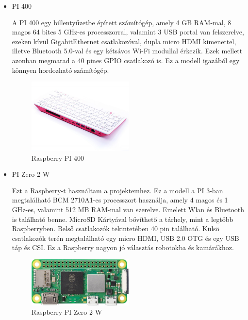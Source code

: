 \documentclass[a4paper,12pt,oneside]{report}
\begin{document}
\begin{itemize}
	\item{PI 400}

	A PI 400 egy billentyűzetbe épített számítógép, amely 4 GB RAM-mal, 8 magos 64 bites 5 GHz-es processzorral, valamint 3 USB portal 
	van felszerelve, ezeken kívül GigabitEthernet csatlakozóval, dupla micro HDMI kimenettel, illetve Bluetooth 5.0-val és 
	egy kétsávos Wi-Fi modullal érkezik. Ezek mellett azonban megmarad a 40 pines GPIO csatlakozó is.
	Ez a modell igazából egy könnyen hordozható számítógép.
	
	\begin{figure}[htbp]
		\centering
		\includegraphics[width=0.5\textwidth]{fig/pi400.png}
		\caption{Raspberry PI 400}
		\label{fig-pi400}
	\end{figure}

	\item{PI Zero 2 W}

	Ezt a Raspberry-t használtam a projektemhez.
	Ez a modell a PI 3-ban megtalálható BCM 2710A1-es processzort használja, amely 4 magos és 1 GHz-es, valamint 512 MB RAM-mal 
	van szerelve.
	Emelett Wlan és Bluetooth is található benne. MicroSD Kártyával bővíthető a tárhely, mint a legtöbb Raspberryben.
	Belső csatlakozók tekintetében 40 pin található.
	Külsö csatlakozók terén megtalálható egy micro HDMI, USB 2.0 OTG és egy USB táp és CSI.
	Ez a Raspberry nagyon jó választás robotokba és kamárákhoz.
	\begin{figure}[htbp]
		\centering
		\includegraphics[width=0.5\textwidth]{fig/pi0.png}
		\caption{Raspberry PI Zero 2 W}
		\label{fig-pi0}
	\end{figure}


\end{itemize}
\end{document}
